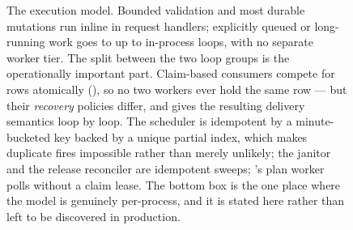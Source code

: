\begin{figure}[tbp]
\begin{cbscaled}[0.68]
\begin{tikzpicture}[x=1cm,y=1cm]
\end{tikzpicture}
\end{cbscaled}
\caption{The execution model. Bounded validation and most durable mutations run
inline in request handlers; explicitly queued or long-running work goes to up to
\statLoops{} in-process loops, with no separate worker tier. The split between the
two loop groups is the operationally important part. Claim-based consumers compete
for rows atomically (), so no two workers ever hold the same row
--- but their \emph{recovery} policies differ, and  gives the
resulting delivery semantics loop by loop. The scheduler is idempotent by a minute-bucketed key backed by a unique
partial index, which makes duplicate fires impossible rather than merely
unlikely; the janitor and the release reconciler are idempotent sweeps;
\aria's plan worker polls without a claim lease. The bottom box is the one place where the model is genuinely
per-process, and it is stated here rather than left to be discovered in
production.}
\label{fig:execution}
\end{figure}
